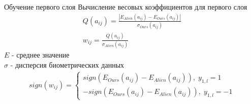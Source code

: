 \begin{frame}{Обучение первого слоя}
    Вычисление весовых коэффициентов для первого слоя
    \begin{gather*}
        Q(a_{ij}) = \frac{|E_{Alien}(a_{ij}) - E_{Ours}(a_{ij})|}{\sigma_{Ours}(a_{ij})} \\
        w_{ij} = \frac{Q(a_{ij})}{\sigma_{Alien}(a_{ij})}
    \end{gather*}
    $E$ - среднее значение \\
    $\sigma$ - дисперсия биометрических данных
    \begin{gather*}
        sign(w_{ij}) = 
        \begin{cases}
            sign(E_{Ours}(a_{ij}) - E_{Alien}(a_{ij})),\; y_{1,l}=1 \\
            -sign(E_{Ours}(a_{ij}) - E_{Alien}(a_{ij})),\; y_{1,l}=-1            
        \end{cases}
    \end{gather*}
\end{frame}